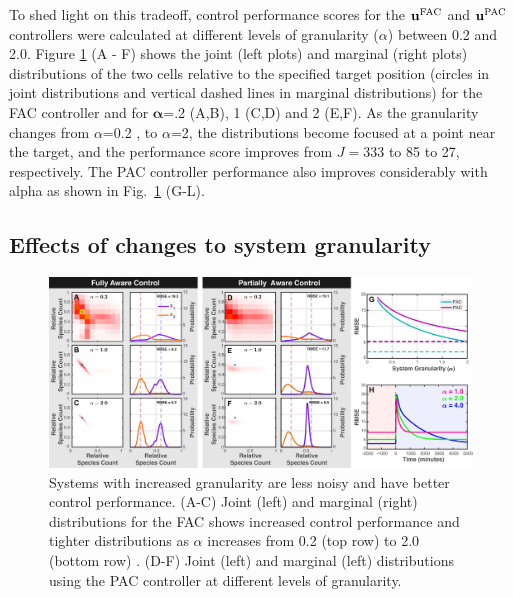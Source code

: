 \documentclass[12pt]{article}
\begin{document}
To shed light on this tradeoff, control performance scores for the $\mathbf{u}^{\rm FAC}$ and $\mathbf{u}^{\rm PAC}$ controllers were calculated at different levels of granularity ($\alpha$) between 0.2 and 2.0. 
Figure \ref{Volume} (A - F) shows the joint (left plots) and marginal (right plots) distributions of the two cells relative to the specified target position (circles in joint distributions and vertical dashed lines in marginal distributions) for the FAC controller and for $\mathbf{\alpha}$=.2 (A,B), 1 (C,D) and 2 (E,F). As the granularity changes from $\alpha$=0.2 , to $\alpha$=2, the distributions become focused at a point near the target, and the performance score improves from $J=$333 to 85 to 27, respectively. The PAC controller performance also improves considerably with alpha as shown in Fig.\ \ref{Volume} (G-L).
\subsection{Effects of changes to system granularity}
\begin{figure}[t!]
\begin{center}
\includegraphics[width=1\textwidth]{Granularity.pdf}
\vspace{-0.1in}
\caption{Systems with increased granularity are less noisy and have better control performance. (A-C) Joint (left) and marginal (right) distributions for the FAC shows increased control performance and tighter distributions as $\alpha$ increases from 0.2 (top row) to 2.0 (bottom row) . (D-F) Joint (left) and marginal (left) distributions using the PAC controller at different levels of granularity.}
\label{Volume}
\end{center}
\vspace{-0.2in}
\end{figure}
\end{document}
